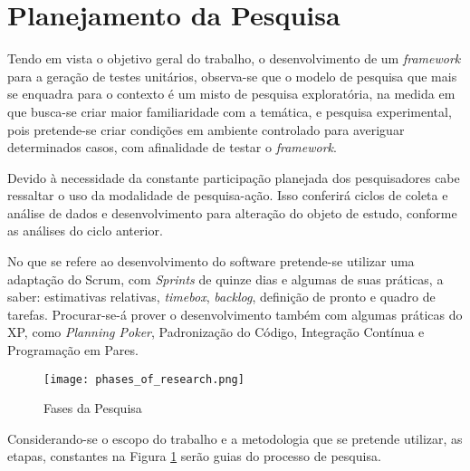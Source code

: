 



  \section{Planejamento da Pesquisa}
  Tendo em vista o objetivo geral do trabalho, o desenvolvimento de um \textit{framework} para a geração de testes unitários, observa-se que o modelo de pesquisa que mais se enquadra para o contexto é um misto de pesquisa exploratória, na medida em que busca-se criar maior familiaridade com a temática, e pesquisa experimental, pois pretende-se criar condições em ambiente controlado para averiguar determinados casos, com afinalidade de testar o \textit{framework}.
  \par
  \indent Devido à necessidade da constante participação planejada dos pesquisadores cabe ressaltar o uso da modalidade de pesquisa-ação. Isso conferirá ciclos de coleta e análise de dados e desenvolvimento para alteração do objeto de estudo, conforme as análises do ciclo anterior.
  \par
  \indent No que se refere ao desenvolvimento do software pretende-se utilizar uma adaptação do Scrum, com \textit{Sprints} de quinze dias e algumas de suas práticas, a saber: estimativas relativas, \textit{timebox}, \textit{backlog}, definição de pronto e quadro de tarefas. Procurar-se-á prover o desenvolvimento também com algumas práticas do XP, como \textit{Planning Poker}, Padronização do Código, Integração Contínua e Programação em Pares.
  \newpage
  \begin{figure}[h]
    \centering
    \texttt{[image: phases\_of\_research.png]}
    \caption{Fases da Pesquisa}
    \label{fig:phases_of_research}
  \end{figure}
  \indent Considerando-se o escopo do trabalho e a metodologia que se pretende utilizar, as etapas, constantes na Figura \ref{fig:phases_of_research} serão guias do processo de pesquisa.
